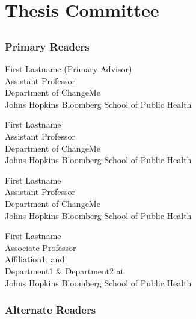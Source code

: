 \chapter*{Thesis Committee}

\section*{}
\subsection*{Primary Readers}

\begin{singlespace}


\indent First Lastname (Primary Advisor)\\
\indent \indent Assistant Professor \\
\indent \indent Department of ChangeMe\\
\indent \indent  Johns Hopkins Bloomberg School of Public Health \\


\smallskip 

\noindent First Lastname \\
\indent \indent Assistant Professor\\
\indent \indent Department of ChangeMe\\
\indent \indent  Johns Hopkins Bloomberg School of Public Health \\

\smallskip 

\noindent First Lastname \\
\indent \indent Assistant Professor\\
\indent \indent Department of ChangeMe \\
\indent \indent Johns Hopkins Bloomberg School of Public Health \\

\smallskip


\noindent First Lastname \\
\indent \indent Associate Professor\\
\indent \indent Affiliation1, and\\
\indent \indent Department1 \& Department2 at\\
\indent \indent Johns Hopkins Bloomberg School of Public Health \\


\end{singlespace}

\subsection*{Alternate Readers}

